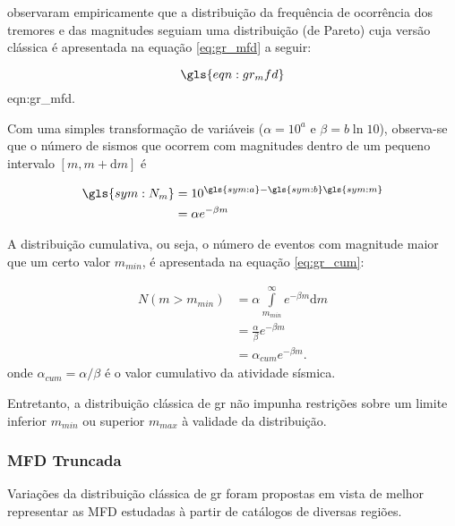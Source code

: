 \citet{gutenberg_1944} observaram empiricamente que a distribuição da frequência de ocorrência dos tremores e
das magnitudes seguiam uma distribuição (de Pareto) cuja versão clássica é apresentada na equação \eqref{eq:gr_mfd} a
seguir:

\begin{equation}
	\gls{eqn:gr_mfd}
	\label{eq:gr_mfd}
\end{equation}
\glsdesc*{eqn:gr_mfd}.

Com uma simples transformação de variáveis ($\alpha = 10^a$ e $\beta = b\ln{10}$), observa-se que o número de sismos que ocorrem 
com magnitudes dentro de um pequeno intervalo $[m, m+\mathrm{d}m]$ é

\begin{equation}
	\begin{split}
		\gls{sym:N_m} &= 10^{\gls{sym:a} - \gls{sym:b}\gls{sym:m}} \\
					  &= \alpha e^{-\beta m}
	\end{split}
	\label{eq:gr_exp}
\end{equation}

A distribuição cumulativa, ou seja, o número de eventos com magnitude maior que um certo valor $m_{min}$, é apresentada
na equação \eqref{eq:gr_cum}:

\begin{equation}
	\begin{split}
		N(m > m_{min}) &= \alpha \int\limits_{m_{min}}^{\infty}e^{-\beta m}\mathrm{d}m \\
					   &= \frac{\alpha}{\beta} e^{-\beta m} \\
					   &= \alpha_{cum} e^{-\beta m}.
	\end{split}
	\label{eq:gr_cum}
\end{equation}
onde $\alpha_{cum} = \alpha / \beta $ é o valor cumulativo da atividade sísmica.


Entretanto, a distribuição clássica de \gls{gr} não impunha restrições sobre um limite inferior $m_{min}$ 
ou superior $m_{max}$ à validade da distribuição.



\subsubsection{MFD Truncada}
\label{sec:TMFD}

Variações da distribuição clássica de \gls{gr} foram propostas em vista de melhor representar as MFD estudadas à partir de
catálogos de diversas regiões.

